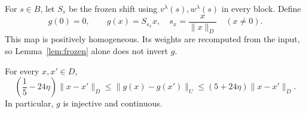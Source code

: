 For \(s\in B\), let \(S_s\) be the frozen shift using
\(v^\lambda(s),w^\lambda(s)\) in every block. Define
\begin{equation}
 g(0)=0,\qquad
 g(x)=S_{s_x}x,\quad s_x=\frac{x}{\|x\|_D}\quad(x\ne0).        \label{eq:g-definition}
\end{equation}
This map is positively homogeneous. Its weights are recomputed from
the input, so Lemma~\ref{lem:frozen} alone does not invert \(g\).

\begin{proposition}\label{prop:global}
For every \(x,x'\in D\),
\begin{equation}
 \left(\frac15-24\eta\right)\|x-x'\|_D
 \leq\|g(x)-g(x')\|_U
 \leq(5+24\eta)\|x-x'\|_D.                                  \label{eq:global-bounds}
\end{equation}
In particular, \(g\) is injective and continuous.
\end{proposition}

